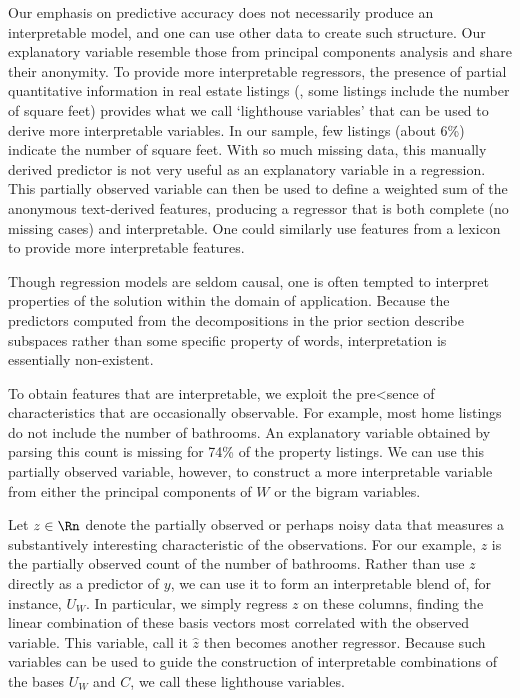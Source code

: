 \documentclass[12pt]{article}
\begin{document}
 

 Our emphasis on predictive accuracy does not necessarily produce an
 interpretable model, and one can use other data to create such structure.  Our
 explanatory variable resemble those from principal components analysis and
 share their anonymity.  To provide more interpretable regressors, the presence
 of partial quantitative information in real estate listings (\eg, some listings
 include the number of square feet) provides what we call ‘lighthouse variables’
 that can be used to derive more interpretable variables.  In our sample, few
 listings (about 6\%) indicate the number of square feet.  With so much missing
 data, this manually derived predictor is not very useful as an explanatory
 variable in a regression.  This partially observed variable can then be used to
 define a weighted sum of the anonymous text-derived features, producing a
 regressor that is both complete (no missing cases) and interpretable.  One
 could similarly use features from a lexicon to provide more interpretable
 features.


Though regression models are seldom causal, one is often tempted to interpret
 properties of the solution within the domain of application.  Because the
 predictors computed from the decompositions in the prior section describe
 subspaces rather than some specific property of words, interpretation is
 essentially non-existent.


 To obtain features that are interpretable, we exploit the pre<sence of
 characteristics that are occasionally observable.  For example,
 most home listings do not include the number of bathrooms.  An
 explanatory variable obtained by parsing this count is missing for 74\% of the property listings.  We can use this partially observed variable, however, to construct a more interpretable variable from either the principal components of $W$ or the bigram variables.  


 Let $z \in \Rn$ denote the partially observed or perhaps noisy data
 that measures a substantively interesting characteristic of the
 observations.  For our example, $z$ is the partially observed count of the number of bathrooms.  Rather than use $z$ directly as a predictor of $y$, we
 can use it to form an interpretable blend of, for instance, $U_W$.   In
 particular, we simply regress $z$ on these columns, finding the
 linear combination of these basis vectors most correlated with the
 observed variable.  This variable, call it $\hat{z}$ then becomes
 another regressor.  Because such variables can be used to guide the
 construction of interpretable combinations of the bases $U_W$ and
 $C$, we call these lighthouse variables.  
 
\end{document}
